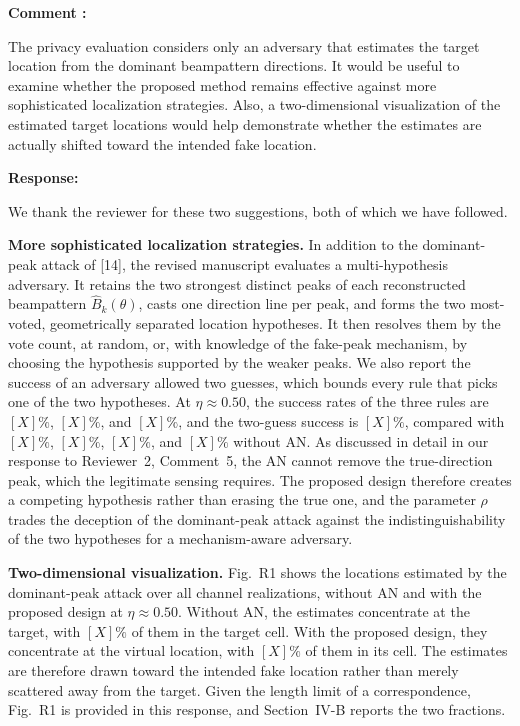 \documentclass[a4paper,12pt]{article}
\newcounter{reviewcomment}
\newenvironment{reviewcomment}{%
  \stepcounter{reviewcomment}%
  \begin{shaded}
  \textbf{Comment \thereviewcomment:}\par
}{\end{shaded}}
\newenvironment{response}{\par\textbf{Response:}\par}{\par}
\begin{document}
\begin{reviewcomment}
The privacy evaluation considers only an adversary that estimates the target
location from the dominant beampattern directions. It would be useful to
examine whether the proposed method remains effective against more
sophisticated localization strategies. Also, a two-dimensional visualization
of the estimated target locations would help demonstrate whether the
estimates are actually shifted toward the intended fake location.
\end{reviewcomment}
\begin{response}
We thank the reviewer for these two suggestions, both of which we have
followed.

\textbf{More sophisticated localization strategies.} In addition to the
dominant-peak attack of [14], the revised manuscript evaluates a
multi-hypothesis adversary. It retains the two strongest distinct peaks of
each reconstructed beampattern $\widehat{B}_k(\theta)$, casts one direction
line per peak, and forms the two most-voted, geometrically separated
location hypotheses. It then resolves them by the vote count, at random, or,
with knowledge of the fake-peak mechanism, by choosing the hypothesis
supported by the weaker peaks. We also report the success of an adversary
allowed two guesses, which bounds every rule that picks one of the two
hypotheses. At $\eta\approx0.50$, the success rates of the three rules are
$[X]\%$, $[X]\%$, and $[X]\%$, and the two-guess success is $[X]\%$,
compared with $[X]\%$, $[X]\%$, $[X]\%$, and $[X]\%$ without AN. As
discussed in detail in our response to Reviewer~2, Comment~5, the AN cannot
remove the true-direction peak, which the legitimate sensing requires. The
proposed design therefore creates a competing hypothesis rather than
erasing the true one, and the parameter $\rho$ trades the deception of the
dominant-peak attack against the indistinguishability of the two
hypotheses for a mechanism-aware adversary.

\textbf{Two-dimensional visualization.} Fig.~R1 shows the locations
estimated by the dominant-peak attack over all channel realizations, without
AN and with the proposed design at $\eta\approx0.50$. Without AN, the
estimates concentrate at the target, with $[X]\%$ of them in the target
cell. With the proposed design, they concentrate at the virtual location,
with $[X]\%$ of them in its cell. The estimates are therefore drawn toward
the intended fake location rather than merely scattered away from the
target. Given the length limit of a correspondence, Fig.~R1 is provided in
this response, and Section~IV-B reports the two fractions.


\end{response}
\end{document}
